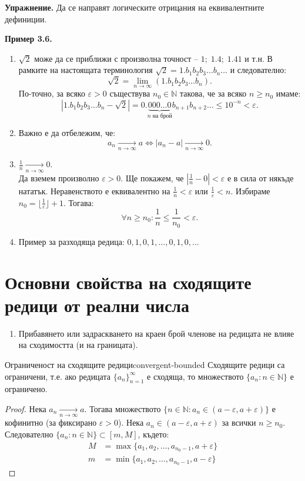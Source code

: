 \noindent\textbf{Упражнение.} Да се направят логическите отрицания на еквивалентните дефиниции.

\noindent\textbf{Пример 3.6.}
\begin{enumerate}
    \item $\sqrt{2}$ може да се приближи с произволна точност -- $1;\; 1.4;\; 1.41$ и т.н. В рамките на настоящата терминология $\sqrt{2} = 1.b_1b_2b_3\dots b_n\dots$ и следователно:
    \[
    \sqrt{2} = \lim_{n\to\infty} (1.b_1b_2b_3\dots b_n).
    \]
    По-точно, за всяко $\varepsilon > 0$ съществува $n_0 \in \mathbb{N}$ такова, че за всяко $n \ge n_0$ имаме:
    \[
    |1.b_1b_2b_3\dots b_n - \sqrt{2}| = 0.\underbrace{000\dots 0}_{n \text{ на брой}}b_{n+1}b_{n+2}\dots \le 10^{-n} < \varepsilon.
    \]
    \item Важно е да отбележим, че:
    \[
    a_n \xrightarrow[n\to\infty]{} a \iff |a_n - a| \xrightarrow[n\to\infty]{} 0.
    \]
    \item $\frac{1}{n} \xrightarrow[n\to\infty]{} 0$. \\
    Да вземем произволно $\varepsilon > 0$. Ще покажем, че $\left|\frac{1}{n} - 0\right| < \varepsilon$ е в сила от някъде нататък. Неравенството е еквивалентно на $\frac{1}{n} < \varepsilon$ или $\frac{1}{\varepsilon} < n$. Избираме $n_0 = \lfloor\frac{1}{\varepsilon}\rfloor + 1$. Тогава:
    \[
    \forall n \ge n_0 : \frac{1}{n} \le \frac{1}{n_0} < \varepsilon.
    \]
    \item Пример за разходяща редица: $0, 1, 0, 1, \dots, 0, 1, 0, \dots$
\end{enumerate}

\section{Основни свойства на сходящите редици от реални числа}

\begin{enumerate}
    \item Прибавянето или задраскването на краен брой членове на редицата не влияе на сходимостта (и на границата).
\end{enumerate}

\begin{theorem}{Ограниченост на сходящите редици}{convergent-bounded}
Сходящите редици са ограничени, т.е. ако редицата $\{a_n\}_{n=1}^\infty$ е сходяща, то множеството $\{a_n : n \in \mathbb{N}\}$ е ограничено.
\end{theorem}

\begin{proof}
Нека $a_n \xrightarrow[n\to\infty]{} a$. Тогава множеството $\{n \in \mathbb{N} : a_n \in (a - \varepsilon, a + \varepsilon)\}$ е кофинитно (за фиксирано $\varepsilon > 0$). Нека $a_n \in (a - \varepsilon, a + \varepsilon)$ за всички $n \ge n_0$. Следователно $\{a_n : n \in \mathbb{N}\} \subset [m, M]$, където:
\begin{align*}
M &= \max \{a_1, a_2, \dots, a_{n_0-1}, a + \varepsilon\} \\
m &= \min \{a_1, a_2, \dots, a_{n_0-1}, a - \varepsilon\}
\end{align*}
\end{proof}


